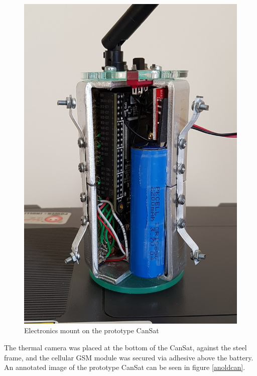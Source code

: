 \documentclass[]{report}
\begin{document}
\begin{figure}[h]
	\hfill\includegraphics[scale=0.4]{old_cansat_side.jpg}\hspace*{\fill}
	\caption{Electronics mount on the prototype CanSat}
	\label{emount}
\end{figure}

The thermal camera was placed at the bottom of the CanSat, against the steel frame, and the cellular GSM module was secured via adhesive above the battery. An annotated image of the prototype CanSat can be seen in figure \ref{anoldcan}.
\end{document}
